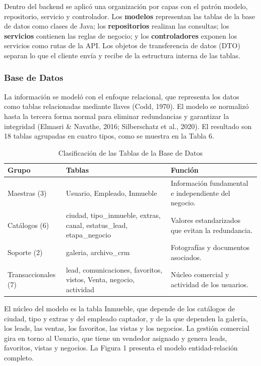 \documentclass[stu,12pt,letterpaper,donotrepeattitle,floatsintext]{apa7}
\begin{document}
Dentro del backend se aplicó una organización por capas con el patrón modelo, repositorio, servicio y controlador. Los \textbf{modelos} representan las tablas de la base de datos como clases de Java; los \textbf{repositorios} realizan las consultas; los \textbf{servicios} contienen las reglas de negocio; y los \textbf{controladores} exponen los servicios como rutas de la API. Los objetos de transferencia de datos (DTO) separan lo que el cliente envía y recibe de la estructura interna de las tablas.

\subsubsection{Base de Datos}

La información se modeló con el enfoque relacional, que representa los datos como tablas relacionadas mediante llaves (Codd, 1970). El modelo se normalizó hasta la tercera forma normal para eliminar redundancias y garantizar la integridad (Elmasri \& Navathe, 2016; Silberschatz et al., 2020). El resultado son 18 tablas agrupadas en cuatro tipos, como se muestra en la Tabla 6.

\begin{table}[htbp]
\caption{Clasificación de las Tablas de la Base de Datos}
\small
\begin{tabularx}{\linewidth}{>{\hsize}L>{\hsize}L>{\hsize}L}
\toprule
\textbf{Grupo} & \textbf{Tablas} & \textbf{Función} \\
\midrule
Maestras (3) & Usuario, Empleado, Inmueble & Información fundamental e independiente del negocio. \\
Catálogos (6) & ciudad, tipo\_inmueble, extras, canal, estatus\_lead, etapa\_negocio & Valores estandarizados que evitan la redundancia. \\
Soporte (2) & galeria, archivo\_crm & Fotografías y documentos asociados. \\
Transaccionales (7) & lead, comunicaciones, favoritos, vistos, Venta, negocio, actividad & Núcleo comercial y actividad de los usuarios. \\
\bottomrule
\end{tabularx}
\end{table}

El núcleo del modelo es la tabla Inmueble, que depende de los catálogos de ciudad, tipo y extras y del empleado captador, y de la que dependen la galería, los leads, las ventas, los favoritos, las vistas y los negocios. La gestión comercial gira en torno al Usuario, que tiene un vendedor asignado y genera leads, favoritos, vistas y negocios. La Figura 1 presenta el modelo entidad-relación completo.
\end{document}
